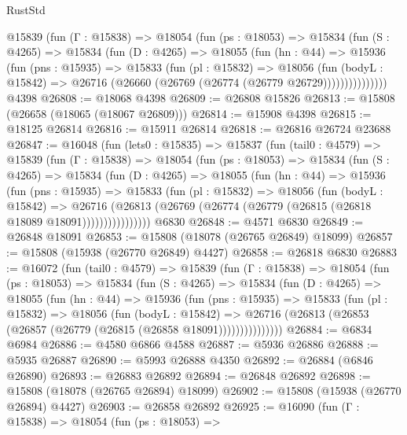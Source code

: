 \begin{lexlean}{RustStd}
\begin{coremodule}
        @15839
          (fun (Γ : @15838) =>
          @18054
            (fun (ps : @18053) =>
            @15834
              (fun (S : @4265) =>
              @15834
                (fun (D : @4265) =>
                @18055
                  (fun (hn : @44) =>
                  @15936
                    (fun (pns : @15935) =>
                    @15833
                      (fun (pl : @15832) =>
                      @18056
                        (fun (bodyL : @15842) =>
                        @26716 (@26660 (@26769 (@26774 (@26779 @26729)))))))))))))))
    @4398
@26808 := @18068 @4398
@26809 := @26808 @15826
@26813 := @15808 (@26658 (@18065 (@18067 @26809)))
@26814 := @15908 @4398
@26815 := @18125 @26814
@26816 := @15911 @26814
@26818 := @26816 @26724 @23688
@26847 := @16048
    (fun (lets0 : @15835) =>
    @15837
      (fun (tail0 : @4579) =>
      @15839
        (fun (Γ : @15838) =>
        @18054
          (fun (ps : @18053) =>
          @15834
            (fun (S : @4265) =>
            @15834
              (fun (D : @4265) =>
              @18055
                (fun (hn : @44) =>
                @15936
                  (fun (pns : @15935) =>
                  @15833
                    (fun (pl : @15832) =>
                    @18056
                      (fun (bodyL : @15842) =>
                      @26716
                        (@26813
                          (@26769 (@26774 (@26779 (@26815 (@26818 @18089 @18091))))))))))))))))
    @6830
@26848 := @4571 @6830
@26849 := @26848 @18091
@26853 := @15808 (@18078 (@26765 @26849) @18099)
@26857 := @15808 (@15938 (@26770 @26849) @4427)
@26858 := @26818 @6830
@26883 := @16072
    (fun (tail0 : @4579) =>
    @15839
      (fun (Γ : @15838) =>
      @18054
        (fun (ps : @18053) =>
        @15834
          (fun (S : @4265) =>
          @15834
            (fun (D : @4265) =>
            @18055
              (fun (hn : @44) =>
              @15936
                (fun (pns : @15935) =>
                @15833
                  (fun (pl : @15832) =>
                  @18056
                    (fun (bodyL : @15842) =>
                    @26716 (@26813 (@26853 (@26857 (@26779 (@26815 (@26858 @18091)))))))))))))))
@26884 := @6834 @6984
@26886 := @4580 @6866 @4588
@26887 := @5936 @26886
@26888 := @5935 @26887
@26890 := @5993 @26888 @4350
@26892 := @26884 (@6846 @26890)
@26893 := @26883 @26892
@26894 := @26848 @26892
@26898 := @15808 (@18078 (@26765 @26894) @18099)
@26902 := @15808 (@15938 (@26770 @26894) @4427)
@26903 := @26858 @26892
@26925 := @16090
    (fun (Γ : @15838) =>
    @18054
      (fun (ps : @18053) =>

\end{coremodule}
\end{lexlean}
